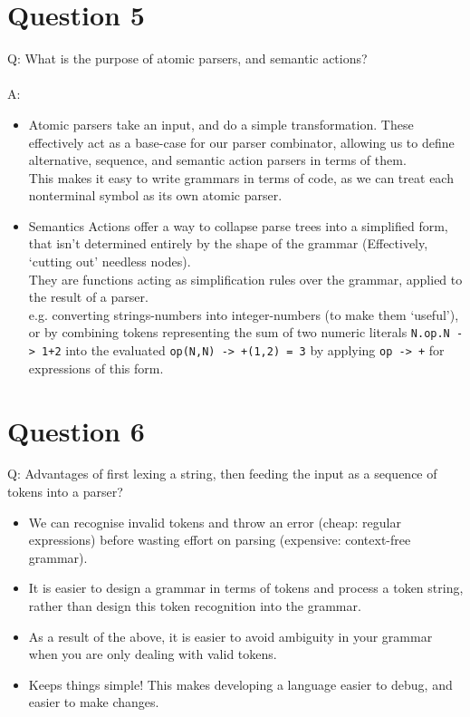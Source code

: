 \documentclass[english]{scrartcl}
\begin{document}
\section*{Question 5}
Q: What is the purpose of atomic parsers, and semantic actions? \\
\\
A:
\begin{itemize}
  \item Atomic parsers take an input, and do a simple transformation. These effectively act as a base-case for our parser combinator, allowing us to define alternative, sequence, and semantic action parsers in terms of them.\\
  This makes it easy to write grammars in terms of code, as we can treat each nonterminal symbol as its own atomic parser.
  \item Semantics Actions offer a way to collapse parse trees into a simplified form, that isn't determined entirely by the shape of the grammar (Effectively, `cutting out' needless nodes).\\
  They are functions acting as simplification rules over the grammar, applied to the result of a parser. \\
  e.g. converting strings-numbers into integer-numbers (to make them `useful'), or by combining tokens representing the sum of two numeric literals \verb~N.op.N -> 1+2~ into the evaluated \verb~op(N,N) -> +(1,2) = 3~ by applying \verb~op -> +~ for expressions of this form.
\end{itemize}


\section*{Question 6}
Q: Advantages of first lexing a string, then feeding the input as a sequence of tokens into a parser? \\
\begin{itemize}
  \item We can recognise invalid tokens and throw an error (cheap: regular expressions) before wasting effort on parsing (expensive: context-free grammar).
  \item It is easier to design a grammar in terms of tokens and process a token string, rather than design this token recognition into the grammar.
  \item As a result of the above, it is easier to avoid ambiguity in your grammar when you are only dealing with valid tokens.
  \item Keeps things simple! This makes developing a language easier to debug, and easier to make changes.
\end{itemize}
\end{document}
